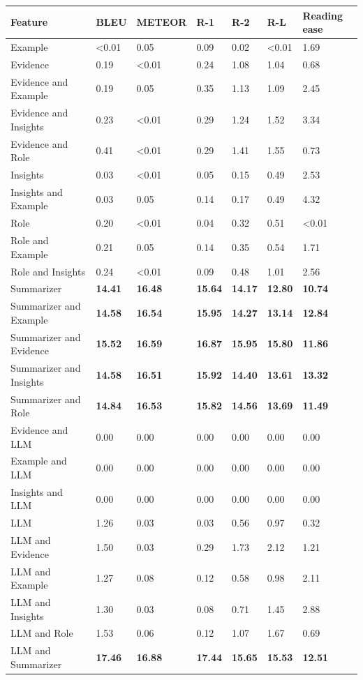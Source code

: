 \begin{tabular}{|l|l|l|l|l|l|l|}
\hline
\textbf{Feature} & BLEU & METEOR & R-1 & R-2 & R-L & Reading ease \\
 \hline
 Example & \textless{}0.01 & 0.05 & 0.09 & 0.02 & \textless{}0.01 & 1.69 \\
 \hline
 Evidence & 0.19 & \textless{}0.01 & 0.24 & 1.08 & 1.04 & 0.68 \\
 \hline
 Evidence and Example & 0.19 & 0.05 & 0.35 & 1.13 & 1.09 & 2.45 \\
 \hline
 Evidence and Insights & 0.23 & \textless{}0.01 & 0.29 & 1.24 & 1.52 & 3.34 \\
 \hline
 Evidence and Role & 0.41 & \textless{}0.01 & 0.29 & 1.41 & 1.55 & 0.73 \\
 \hline
 Insights & 0.03 & \textless{}0.01 & 0.05 & 0.15 & 0.49 & 2.53 \\
 \hline
 Insights and Example & 0.03 & 0.05 & 0.14 & 0.17 & 0.49 & 4.32 \\
 \hline
 Role & 0.20 & \textless{}0.01 & 0.04 & 0.32 & 0.51 & \textless{}0.01 \\
 \hline
 Role and Example & 0.21 & 0.05 & 0.14 & 0.35 & 0.54 & 1.71 \\
 \hline
 Role and Insights & 0.24 & \textless{}0.01 & 0.09 & 0.48 & 1.01 & 2.56 \\
 \hline
 Summarizer & \textbf{14.41} & \textbf{16.48} & \textbf{15.64} & \textbf{14.17} & \textbf{12.80} & \textbf{10.74} \\
 \hline
 Summarizer and Example & \textbf{14.58} & \textbf{16.54} & \textbf{15.95} & \textbf{14.27} & \textbf{13.14} & \textbf{12.84} \\
 \hline
 Summarizer and Evidence & \textbf{15.52} & \textbf{16.59} & \textbf{16.87} & \textbf{15.95} & \textbf{15.80} & \textbf{11.86} \\
 \hline
 Summarizer and Insights & \textbf{14.58} & \textbf{16.51} & \textbf{15.92} & \textbf{14.40} & \textbf{13.61} & \textbf{13.32} \\
 \hline
 Summarizer and Role & \textbf{14.84} & \textbf{16.53} & \textbf{15.82} & \textbf{14.56} & \textbf{13.69} & \textbf{11.49} \\
 \hline
 Evidence and LLM & 0.00 & 0.00 & 0.00 & 0.00 & 0.00 & 0.00 \\
 \hline
 Example and LLM & 0.00 & 0.00 & 0.00 & 0.00 & 0.00 & 0.00 \\
 \hline
 Insights and LLM & 0.00 & 0.00 & 0.00 & 0.00 & 0.00 & 0.00 \\
 \hline
 LLM & 1.26 & 0.03 & 0.03 & 0.56 & 0.97 & 0.32 \\
 \hline
 LLM and Evidence & 1.50 & 0.03 & 0.29 & 1.73 & 2.12 & 1.21 \\
 \hline
 LLM and Example & 1.27 & 0.08 & 0.12 & 0.58 & 0.98 & 2.11 \\
 \hline
 LLM and Insights & 1.30 & 0.03 & 0.08 & 0.71 & 1.45 & 2.88 \\
 \hline
 LLM and Role & 1.53 & 0.06 & 0.12 & 1.07 & 1.67 & 0.69 \\
 \hline
 LLM and Summarizer & \textbf{17.46} & \textbf{16.88} & \textbf{17.44} & \textbf{15.65} & \textbf{15.53} & \textbf{12.51} \\
\hline
\end{tabular}

